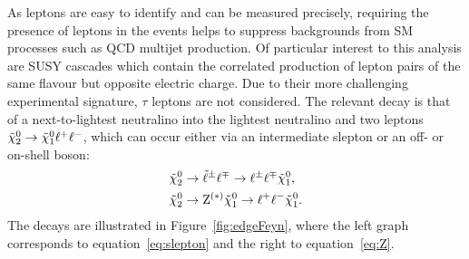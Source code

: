 As leptons are easy to identify and can be measured precisely, requiring the presence of leptons in the events helps to suppress backgrounds from SM processes such as QCD multijet production. Of particular interest to this analysis are SUSY cascades which contain the correlated production of lepton pairs of the same flavour but opposite electric charge. Due to their more challenging experimental signature, $\tau$ leptons are not considered. The relevant decay is that of a next-to-lightest neutralino into the lightest neutralino and two leptons ${\tilde{\chi}^0_2} \rightarrow {\tilde{\chi}^0_1} \ell^+\ell^-$, which can occur either via an intermediate slepton or an off- or on-shell \Z boson:
\begin{align}
{\tilde{\chi}^0_2} &\rightarrow \tilde{\ell}^{\pm}\ell^{\mp} \rightarrow \ell^{\pm}\ell^{\mp}{\tilde{\chi}^0_1},\label{eq:slepton}\\ 
{\tilde{\chi}^0_2} &\rightarrow \mathrm{Z}^{(*)}{\tilde{\chi}^0_1} \rightarrow \ell^+\ell^-{\tilde{\chi}^0_1}.\label{eq:Z}
\end{align}
The decays are illustrated in Figure~\ref{fig:edgeFeyn}, where the left graph corresponds to equation~\ref{eq:slepton} and the right to equation~\ref{eq:Z}.
